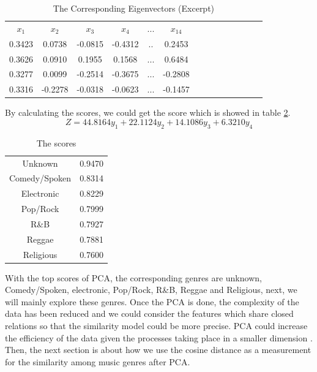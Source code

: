 \documentclass[12pt]{article}
\begin{document}
\begin{table} [H]
\begin{center}
\begin{tabular}{|c|c|c|c|c|c|c|c|c|c|c|c|c|c|}
\toprule
\midrule
$x_1$&$x_2$&$x_3$&$x_4$ & $...$ & $x_{14}$\\
0.3423&0.0738&-0.0815&-0.4312& $..$& 0.2453 \\
0.3626&0.0910&0.1955&0.1568&$...$&0.6484\\
0.3277&0.0099&-0.2514&-0.3675&$...$&-0.2808 \\
0.3316&-0.2278&-0.0318&-0.0623&$...$&-0.1457 \\
\bottomrule
\end{tabular}
\end{center}
\caption{The Corresponding Eigenvectors (Excerpt)}
\label{Eigenvectors}
\end{table}

By calculating the scores, we could get the score which is showed in table \ref{scores}. 
\begin{equation}
Z=44.8164y_1+22.1124y_2+14.1086y_3+6.3210y_4
\end{equation}

\begin{table} [H]
\begin{center}
\begin{tabular}{cc}
\toprule
\midrule
Unknown&0.9470\\
Comedy/Spoken&0.8314\\
Electronic&0.8229\\
Pop/Rock&0.7999\\
R\&B &0.7927\\
Reggae&0.7881\\
Religious&0.7600\\ 
\bottomrule
\end{tabular}
\end{center}
\caption{The scores}
\label{scores}
\end{table}
With the top scores of PCA, the corresponding genres are unknown, Comedy/Spoken, electronic, Pop/Rock, R\&B, Reggae and Religious, next, we will mainly explore these genres. Once the PCA is done, the complexity of the data has been reduced and we could consider the features which share closed relations so that the similarity model could be more precise. PCA could increase the efficiency of the data given the processes taking place in a smaller dimension \cite{article9}. Then, the next section is about how we use the cosine distance as a measurement for the similarity among music genres after PCA.
\end{document}
